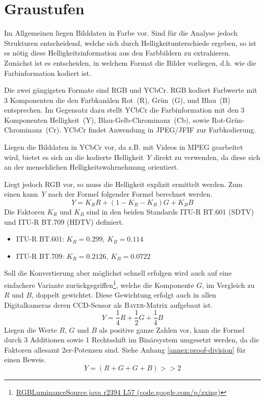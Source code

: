 \section{Graustufen}
\label{sec:grayscale}
\writtenby{\dcauthornameewie}%
Im Allgemeinen liegen Bilddaten in Farbe vor.
Sind für die Analyse jedoch Strukturen entscheidend, welche sich durch Helligkeitunterschiede ergeben, so ist es nötig diese Helligkeitsinformation aus den Farbbildern zu extrahieren.
Zunächst ist es entscheiden, in welchem Format die Bilder vorliegen, d.h. wie die Farbinformation kodiert ist.

Die zwei gängigsten Formate sind RGB und YCbCr.
RGB kodiert Farbwerte mit 3 Komponenten die den Farbkanälen Rot~(R), Grün~(G), und Blau~(B) entsprechen.
Im Gegensatz dazu stellt YCbCr die Farbinformation mit den 3 Komponenten Helligkeit~(Y), Blau-Gelb-Chrominanz~(Cb), sowie Rot-Grün-Chrominanz~(Cr).
YCbCr findet Anwendung in JPEG/JFIF \cite{jfif} zur Farbkodierung.

Liegen die Bilddaten in YCbCr vor, da z.B. mit Videos in MPEG gearbeitet wird, bietet es sich an die kodierte Helligkeit~$Y$ direkt zu verwenden, da diese sich an der menschlichen Helligkeitswahrnehmung orientiert.

Liegt jedoch RGB vor, so muss die Helligkeit explizit ermittelt werden.
Zum einen kann~$Y$ nach der Formel folgender Formel \cite[2.5.1]{itu/rec/601} berechnet werden.
\begin{equation}
  Y = K_R R + (1 - K_R - K_B) G + K_B B
\end{equation}
Die Faktoren $K_R$ und $K_B$ sind in den beiden Standards ITU-R BT.601 (SDTV) und ITU-R BT.709 (HDTV) definiert.
%
\begin{itemize}
\item ITU-R BT.601: $K_R=0.299,~K_B=0.114$ \cite[2.5.1]{itu/rec/601}
\item ITU-R BT.709: $K_R=0.2126,~K_B=0.0722$ \cite[4]{itu/rec/709}
\end{itemize}
%
Soll die Konvertierung aber möglichst schnell erfolgen wird auch auf eine einfachere Variante zurückgegriffen\footnote{\href{https://code.google.com/p/zxing/source/browse/trunk/core/src/com/google/zxing/RGBLuminanceSource.java?spec=svn2633&r=2394\#57}{RGBLuminanceSource.java r2394 L57 (code.google.com/p/zxing)}}, welche die Komponente $G$, im Vergleich zu $R$ und $B$, doppelt gewichtet.
Diese Gewichtung erfolgt auch in allen Digitalkameras deren CCD-Sensor als \textsc{Bayer}-Matrix aufgebaut ist.
\begin{equation}
  Y = \frac{1}{4} R + \frac{1}{2} G + \frac{1}{4}B
\end{equation}
Liegen die Werte $R$, $G$ und $B$ als positive ganze Zahlen vor, kann die Formel durch 3 Additionen sowie 1 Rechtsshift im Binärsystem umgesetzt werden, da die Faktoren allesamt 2er-Potenzen sind.
Siehe Anhang \ref{annex:proof-division} für einen Beweis.
\begin{equation}
  Y = (R + G + G + B) >\!\!> 2
\end{equation}
